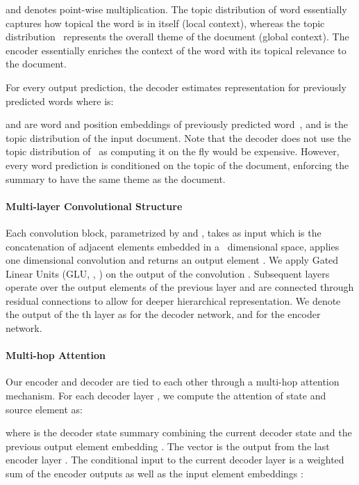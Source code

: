 \documentclass[11pt,a4paper]{article}
\begin{document}
\noindent and  denotes point-wise multiplication. The topic
distribution  of word  essentially captures how topical the
word is in itself (local context), whereas the topic
distribution~ represents the overall theme of the document
(global context). The encoder essentially enriches the context of the
word with its topical relevance to the document.


For every output prediction, the decoder estimates representation
 for previously predicted words
 where  is:

\noindent  and  are word and position embeddings of
previously predicted word~, and  is the topic distribution
of the input document. Note that the decoder does not use the topic
distribution of~ as computing it on the fly would be
expensive. However, every word prediction is conditioned on the topic
of the document, enforcing the summary to have the same theme as the
document.



\paragraph{Multi-layer Convolutional Structure}

Each convolution block, parametrized by  and , takes as input  which is the concatenation of  adjacent
elements embedded in a~ dimensional space, applies one dimensional
convolution and returns an output element . We
apply Gated Linear Units (GLU, , \citeauthor{pmlr-v70-dauphin17a}
\citeyear{pmlr-v70-dauphin17a}) on the output of the convolution
. Subsequent layers operate over the  output elements of the
previous layer and are connected through residual connections
\cite{He2016DeepRL} to allow for deeper hierarchical
representation. We denote the output of the th layer as
 for the decoder
network, and 
for the encoder network.

\paragraph{Multi-hop Attention}

Our encoder and decoder are tied to each other through a multi-hop
attention mechanism. For each decoder layer , we compute the
attention  of state  and source element  as:

\noindent where  is
the decoder state summary combining the current decoder state
 and the previous output element embedding . The
vector  is the output from the last encoder layer
. The conditional input  to the current decoder layer
is a weighted sum of the encoder outputs as well as the input element
embeddings :
\end{document}
